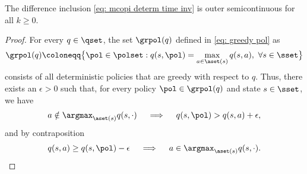 \begin{lemma}
\label{thm: mcopi outer semicontinuous}
    The difference inclusion \eqref{eq: mcopi determ time inv} is outer semicontinuous 
    for all $k \geq 0$.
\end{lemma}

\begin{proof} 
For every $q \in \qset$, the set $\grpol(q)$ defined in \eqref{eq: greedy pol} as
\begin{align*}
    \grpol(q) \coloneqq \big\{ \pol \in \polset : q(s, \pol) = \max_{a \in \aset(s)} q(s,a), \ \forall s \in \sset \big\} 
\end{align*}
consists of all deterministic policies that are greedy with respect to $q$. Thus, there exists an $\epsilon>0$ such that, for every policy $\pol \in \grpol(q)$ and state $s \in \sset$, we have
\begin{align*}
    a \notin \argmax_{\aset(s)} q(s,\cdot)
    \quad\implies\quad 
    q(s, \pol) > q(s, a) + \epsilon ,
\end{align*}
and by contraposition
\begin{align}
\label{eq: action in greedy pol}
    q(s, a) \geq q(s, \pol) - \epsilon
    \quad\implies\quad
    a \in \argmax_{\aset(s)} q(s,\cdot) .
\end{align}


\end{proof}
